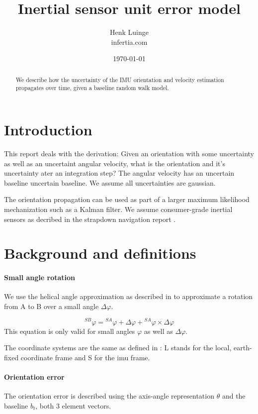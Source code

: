 \documentclass{article}
\title{Inertial sensor unit error model}
\author{Henk Luinge  \\
	infertia.com   \\
	}
\date{\today}
\begin{document}
\maketitle

\begin{abstract}
We describe how the uncertainty of the IMU orientation and velocity estimation propagates over time, given a baseline random walk model.
\end{abstract}

\section{Introduction}

This report deals with the derivation: Given an orientation with some uncertainty as well as an uncertaint angular velocity, what is the orientation and it's uncertainty ater an integration step?  The angular velocity has an uncertain baseline uncertain baseline. We assume all uncertainties are gaussian. 

The orientation propagation can be used as part of a larger maximum likelihood mechanization such as a Kalman filter. We assume consumer-grade inertial sensors as decribed in the strapdown navigation report \cite{Luinge2025}.

\section{Background and definitions}

\paragraph{Small angle rotation}
We use the helical angle approximation as described in  \cite{Bortz1970} to approximate a rotation from A to B over a small angle $\Delta \varphi$.

\begin{equation} \label{eq:small_angles_orientation_update}
{}^{SB} \varphi = {}^{SA} \varphi + \Delta \varphi + {}^{SA} \varphi \times \Delta \varphi
\end{equation}
This equation is only valid for small angles $\varphi $ as well as $\Delta \varphi$.

The coordinate systems are the same as defined in \cite{Luinge2025}: L stands for the local, earth-fixed coordinate frame and S for the imu frame.

\paragraph{Orientation error}
The orientation error is described using the axis-angle representation $\theta$ and the baseline $b_t$, both 3 element vectors.
\end{document}
